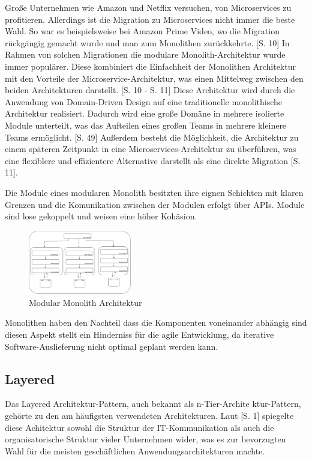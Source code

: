 \documentclass[acmtog]{acmart}
\begin{document}
Große Unternehmen wie Amazon und Netflix versuchen, von Microservices 
zu profitieren. Allerdings ist die Migration zu Microservices nicht immer 
die beste Wahl. So war es beispielsweise bei Amazon Prime Video, wo die Migration
rückgängig gemacht wurde und man zum Monolithen zurückkehrte. \cite{modular-mono2}[S. 10]
In Rahmen von solchen Migrationen die modulare Monolith-Architektur wurde immer populärer.
Diese kombiniert die Einfachheit der Monolithen Architektur mit den 
Vorteile der Microservice-Architektur, was einen Mittelweg zwischen 
den beiden Architekturen darstellt. \cite{modular-mono2}[S. 10 - S. 11]
Diese Architektur wird durch die Anwendung von Domain-Driven Design auf 
eine traditionelle monolithische Architektur realisiert.
Dadurch wird eine große Domäne in mehrere isolierte Module unterteilt, was das Aufteilen 
 eines großen Teams in mehrere kleinere Teams ermöglicht. \cite{modular-mono1}[S. 49]
 Außerdem besteht die Möglichkeit, die Architektur zu einem 
späteren Zeitpunkt in eine Microservices-Architektur zu 
überführen, was eine flexiblere und effizientere Alternative darstellt
als eine direkte Migration \cite{modular-mono1}[S. 11].

Die Module eines modularen Monolith besitzten ihre eignen Schichten
 mit klaren Grenzen und die Komunikation zwischen der Modulen 
 erfolgt über APIs. Module sind lose gekoppelt und weisen eine 
 höher Kohäsion. \cite{modular-mono2}


\begin{figure}[h!]
    \centering
    \includegraphics[width=0.4\textwidth]{images/mono-modular.pdf}
    \caption{Modular Monolith Architektur}
    \label{fig:modular-mono}
\end{figure}

Monolithen haben den Nachteil dass die Komponenten voneinander abhängig sind
 diesen Aspekt stellt ein Hinderniss für die agile Entwicklung, da 
 iterative Software-Auslieferung nicht optimal geplant werden kann.

\subsection{Layered}
Das Layered Architektur-Pattern, auch bekannt als n-Tier-Archite
ktur-Pattern, gehörte zu den am häufigsten verwendeten Architekturen. Laut \cite{layered}[S. 1] 
spiegelte diese Achitektur sowohl die Struktur der IT-Kommunikation als auch die organisatorische Struktur vieler Unternehmen wider,
was es zur bevorzugten Wahl für die meisten geschäftlichen Anwendungsarchitekturen machte. 
\end{document}
